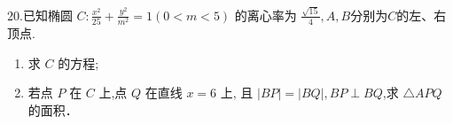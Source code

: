 \documentclass[class=ctexart,crop=false]{standalone}
\begin{document}
20.已知椭圆 $ C:\frac{x^2}{25}+\frac{y^2}{m^2}=1(0<m<5)$
 的离心率为 $\frac{\sqrt{15}}{4},A,B$分别为$C$的左、右顶点.
 \begin{enumerate}[label=(\arabic*)]
     \item 求 $C$ 的方程;
     \item 若点 $P$ 在 $C$ 上,点 $Q$ 在直线 $x=6$ 上,
     且 $|BP|=|BQ|,BP\perp BQ$,求 $\triangle APQ$ 的面积．
 \end{enumerate}
\end{document}
